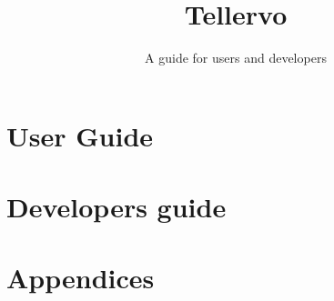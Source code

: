 \documentclass[10pt, twopage headsepline]{manual}
\title{Tellervo}
\subtitle{A guide for users and developers}
\begin{document}
  
  

  \part{User Guide}
    
    
    
    
    
    
    
    
    
    
    
    

  \part{Developers guide}
    
    
    
    
    

  \part{Appendices}
    \appendix
    
    
    

    \cleardoublepage
    
    \begin{multicols}{2}
      
    \end{multicols}
    
    \cleardoublepage
    \printindex

    
\end{document}
